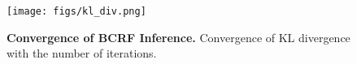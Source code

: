 \begin{figure}[t]
\vspace{-0.7cm}
  \centering
  \texttt{[image: figs/kl\_div.png]}
  \vspace{-0.5cm}
  \caption{{\bf Convergence of BCRF Inference.} Convergence of KL divergence with the number of iterations.\vspace{0.0cm}}
  \label{fig:kl_div}
\vspace{0.5cm}
\end{figure}
